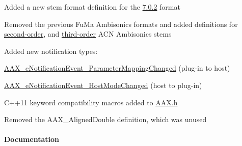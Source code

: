 \begin{DoxyItemize}
\item Added a new stem format definition for the \mbox{\hyperlink{a00491_ad8af5ef008b2bd478add9a0acb0a1d85ad4d60796473e660c7bc2804cdc93c587}{7.0.2}} format  
\item Removed the previous Fu\+Ma Ambisonics formats and added definitions for \mbox{\hyperlink{a00491_ad8af5ef008b2bd478add9a0acb0a1d85af6461ee858e0f121f7a070142f047dbb}{second-\/order}}, and \mbox{\hyperlink{a00491_ad8af5ef008b2bd478add9a0acb0a1d85a111ef1882171d9eea1b1b436e037fb47}{third-\/order}} A\+CN Ambisonics stems  
\item Added new notification types\+: 
\begin{DoxyItemize}
\item \mbox{\hyperlink{a00491_afab5ea2cfd731fc8f163b6caa685406ea92f2ef0cec96b2654789e708d1a1b5e3}{A\+A\+X\+\_\+e\+Notification\+Event\+\_\+\+Parameter\+Mapping\+Changed}} (plug-\/in to host) 
\item \mbox{\hyperlink{a00491_afab5ea2cfd731fc8f163b6caa685406ea59ab8642f090b5ae21385982a1ffaa7b}{A\+A\+X\+\_\+e\+Notification\+Event\+\_\+\+Host\+Mode\+Changed}} (host to plug-\/in) 
\end{DoxyItemize}
\item C++11 keyword compatibility macros added to \mbox{\hyperlink{a00392}{A\+A\+X.\+h}}  
\item Removed the {\ttfamily A\+A\+X\+\_\+\+Aligned\+Double} definition, which was unused  
\end{DoxyItemize}\hypertarget{a00847_aax_sdk_2p3p0_Documentation}{}\paragraph{Documentation}\label{a00847_aax_sdk_2p3p0_Documentation}


